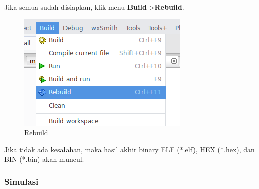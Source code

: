 \documentclass[12pt,]{article}
\begin{document}
	\newpage
	Jika semua sudah disiapkan, klik menu \textbf{Build}->\textbf{Rebuild}.
	\begin{figure}[H]
		\centering
		\includegraphics[width=0.5\linewidth]{images/hello_a15}
		\caption{Rebuild}
	\end{figure}
	
	Jika tidak ada kesalahan, maka hasil akhir binary ELF (*.elf), HEX (*.hex), dan BIN (*.bin) akan muncul.
	
	\newpage
	\subsubsection{Simulasi}
	
\end{document}
